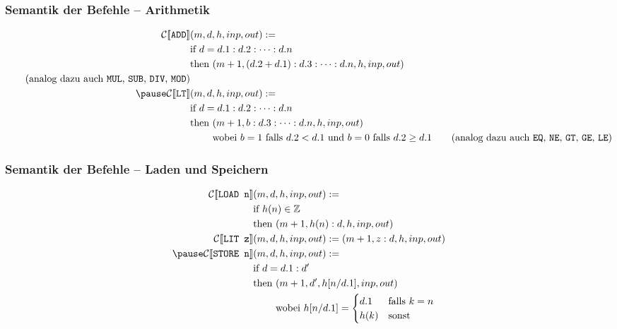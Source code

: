 \documentclass{beamer}
\begin{document}

\begin{frame} \frametitle{Semantik der Befehle -- Arithmetik}
	\small
	\begin{align*}
		\mathcal{C} [\![ \texttt{ADD} ]\!] &(m,d,h,inp,out) \defeq  \\
		&\text{if } d = d.1 : d.2 : \dots : d.n \\
		&\text{then } (m+1, (d.2 + d.1) : d.3 : \dots : d.n, h, inp, out) \\ 
		\tag{analog dazu auch \texttt{MUL}, \texttt{SUB}, \texttt{DIV}, \texttt{MOD}} \\ \pause
		\mathcal{C} [\![ \texttt{LT} ]\!] &(m,d,h,inp,out) \defeq  \\
		&\text{if } d = d.1 : d.2 : \dots : d.n \\
		&\text{then } (m+1, b : d.3 : \dots : d.n, h, inp, out) \\
		&\phantom{\text{then }} \text{wobei } b = 1 \text{ falls } d.2 < d.1 \text{ und } b = 0 \text{ falls } d.2 \ge d.1
		\tag{analog dazu auch \texttt{EQ}, \texttt{NE}, \texttt{GT}, \texttt{GE}, \texttt{LE}} 
	\end{align*}
\end{frame}


\begin{frame} \frametitle{Semantik der Befehle -- Laden und Speichern}
	\small
	\begin{align*}
		\mathcal{C} [\![ \texttt{LOAD n} ]\!] &(m,d,h,inp,out) \defeq  \\
		&\text{if } h(n) \in \Z  \\
		&\text{then } (m+1, h(n) : d, h, inp, out) \\
		\mathcal{C} [\![ \texttt{LIT z} ]\!] &(m,d,h,inp,out) \defeq  (m+1, z : d, h, inp, out) \\ \pause
		\mathcal{C} [\![ \texttt{STORE n} ]\!] &(m,d,h,inp,out) \defeq  \\
		&\text{if } d = d.1 : d' \\
		&\text{then } (m+1, d', h[n/d.1], inp, out) \\
		&\phantom{\text{then }} \text{wobei } h[n/d.1] = \begin{cases} d.1 &\text{falls } k = n \\ h(k) &\text{sonst} \end{cases}
	\end{align*}
\end{frame}
\end{document}
